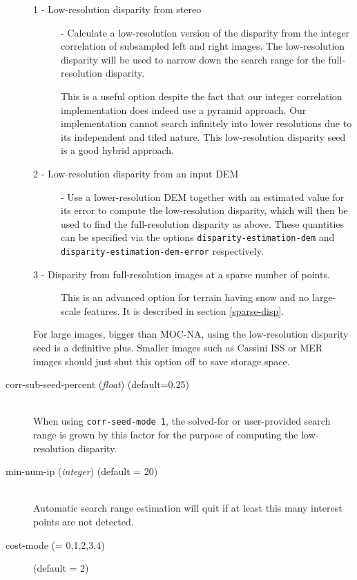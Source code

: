 \begin{description}
\begin{description}
  \item[1 - Low-resolution disparity from stereo] - Calculate a
    low-resolution version of the disparity from the integer correlation
    of subsampled left and right images.  The low-resolution disparity
    will be used to narrow down the search range for the full-resolution
    disparity.

    This is a useful option despite the fact that our integer
    correlation implementation does indeed use a pyramid approach. Our
    implementation cannot search infinitely into lower resolutions due
    to its independent and tiled nature. This low-resolution disparity
    seed is a good hybrid approach.

  \item[2 - Low-resolution disparity from an input DEM] - Use a
    lower-resolution DEM together with an estimated value for its error
    to compute the low-resolution disparity, which will then be used to
    find the full-resolution disparity as above. These quantities can be
    specified via the options \texttt{disparity-estimation-dem} and
    \texttt{disparity-estimation-dem-error} respectively.

  \item[3 - Disparity from full-resolution images at a sparse number of
    points.] This is an advanced option for terrain having snow and no
    large-scale features. It is described in section \ref{sparse-disp}.

  \end{description}

  For large images, bigger than MOC-NA, using the low-resolution
  disparity seed is a definitive plus. Smaller images such as Cassini
  ISS or MER images should just shut this option off to save storage
  space.

\item[corr-sub-seed-percent \textnormal{\small{(\emph{float})}} (default=0.25)] \hfill \\
  When using \texttt{corr-seed-mode 1}, the solved-for or user-provided
  search range is grown by this factor for the purpose of computing the
  low-resolution disparity.

\item[min-num-ip \textnormal{\small{(\emph{integer})}} (default = 20)] \hfill \\
Automatic search range estimation will quit if at least this many interest points are
not detected.

\item[cost-mode \textnormal{\small{(= 0,1,2,3,4)}}] (default = 2) \hfill \\


\end{description}

